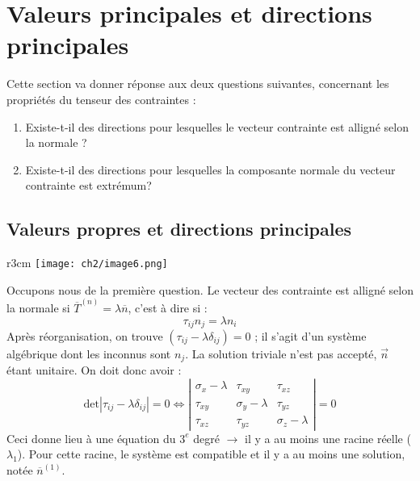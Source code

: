 \section{Valeurs principales et directions principales}
Cette section va donner réponse aux deux questions suivantes, concernant les propriétés du tenseur des
contraintes : 
\begin{enumerate}
\item Existe-t-il des directions pour lesquelles le vecteur contrainte est alligné selon la normale ?
\item Existe-t-il des directions pour lesquelles la composante normale du vecteur contrainte est extrémum?
\end{enumerate}

    \subsection{Valeurs propres et directions principales}
    \begin{wrapfigure}[11]{r}{3cm}
    \texttt{[image: ch2/image6.png]}
    \end{wrapfigure}
    Occupons nous de la première question. Le vecteur des contrainte est alligné selon la normale si 
    $\overline{T}^{(n)} = \lambda \overline{n}$, c'est à dire si :
    \begin{equation}
    \tau_{ij}n_j = \lambda n_i
    \end{equation}
    Après réorganisation, on trouve $(\tau_{ij} - \lambda \delta_{ij}) = 0$ ; il s'agit d'un système
    algébrique dont les inconnus sont $n_j$. La solution triviale n'est pas accepté, $\vec{n}$ étant 
    unitaire. On doit donc avoir : 
    \begin{equation}
    \text{det}|\tau_{ij} - \lambda \delta_{ij}|=0 \Leftrightarrow \left|\begin{array}{ccc}
    \sigma_x - \lambda      &\tau_{xy}              &\tau_{xz}\\
    \tau_{xy}               &\sigma_y-\lambda       &\tau_{yz}\\
    \tau_{xz}               &\tau_{yz}              &\sigma_z - \lambda
    \end{array}\right| = 0
    \end{equation}
    Ceci donne lieu à une équation du $3^e$ degré $\rightarrow$ il y a au moins une racine réelle ($\lambda_1$). 
    Pour cette racine, le système est compatible et il y a au moins une solution, notée $\overline{n}^{(1)}$.
